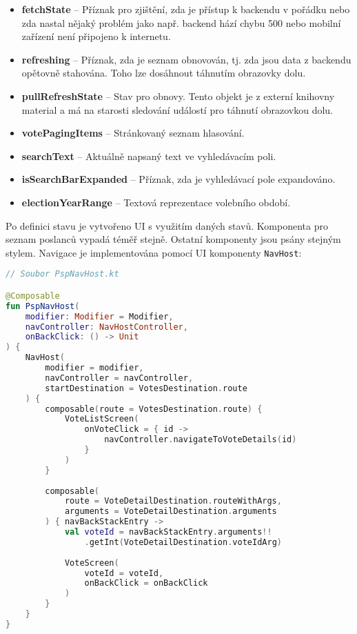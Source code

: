 \begin{itemize}
	\item \textbf{fetchState} -- Příznak pro zjištění, zda je přístup k backendu v pořádku nebo zda nastal nějaký problém jako např. backend hází chybu 500 nebo mobilní zařízení není připojeno \linebreak k internetu.
	
	\item \textbf{refreshing} -- Příznak, zda je seznam obnovován, tj. zda jsou data z backendu opětovně stahována. Toho lze dosáhnout táhnutím obrazovky dolu.
	
	\item \textbf{pullRefreshState} -- Stav pro obnovy. Tento objekt je z externí knihovny material a má na starosti sledování událostí pro táhnutí obrazovkou dolu.
	
	\item \textbf{votePagingItems} -- Stránkovaný seznam hlasování.
	
	\item \textbf{searchText} -- Aktuálně napsaný text ve vyhledávacím poli.
	
	\item \textbf{isSearchBarExpanded} -- Příznak, zda je vyhledávací pole expandováno.
	
	\item \textbf{electionYearRange} -- Textová reprezentace volebního období.
\end{itemize}

\noindent Po definici stavu je vytvořeno UI s využitím daných stavů. Komponenta pro seznam poslanců vypadá téměř stejně. Ostatní komponenty jsou psány stejným stylem. Navigace je implementována pomocí UI komponenty \lstinline|NavHost|:

\begin{lstlisting}[caption={Komponenta pro navigaci}, tabsize=2, language=Kotlin]
// Soubor PspNavHost.kt

@Composable
fun PspNavHost(
	modifier: Modifier = Modifier,
	navController: NavHostController,
	onBackClick: () -> Unit
) {
	NavHost(
		modifier = modifier,
		navController = navController,
		startDestination = VotesDestination.route
	) {
		composable(route = VotesDestination.route) {
			VoteListScreen(
				onVoteClick = { id ->
					navController.navigateToVoteDetails(id)
				}
			)
		}
	
		composable(
			route = VoteDetailDestination.routeWithArgs,
			arguments = VoteDetailDestination.arguments
		) { navBackStackEntry ->
			val voteId = navBackStackEntry.arguments!!
				.getInt(VoteDetailDestination.voteIdArg)
			
			VoteScreen(
				voteId = voteId,
				onBackClick = onBackClick
			)
		}
	}
}
\end{lstlisting}

